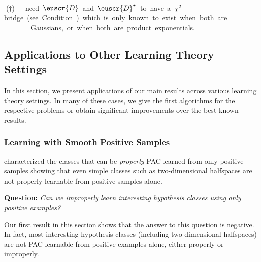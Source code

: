 \documentclass[11pt]{article}
\makeatletter
\newcommand{\white}[1]{\textcolor{white}{#1}}
\theoremstyle{plain}
\theoremstyle{definition}
\theoremstyle{remark}
\renewcommand{\eqref}[1]{\textup{\eqrefform@{\ref{#1}}}}
\let\eqrefform@\tagform@
\newcommand{\customcal}[1]{\euscr{#1}}
\newcommand{\cD}{\customcal{D}}
\newcommand{\cDtrue}{\cD^\star}
\makeatother
\begin{document}
\begin{table}[htb!]
{            \\
            \mbox{\footnotesize \white{.}\quad  ($\dagger$)~~\cite{lee2024unknown} need $\cD$ and $\cDtrue$ to have a $\chi^2$-bridge (see Condition \eqref{unknowntrunc:chisquarebridge}) which is only known to exist when both are}
            \\[-1mm]
            \mbox{\footnotesize \white{.}\quad ~~~~~~ Gaussians, or when both are product exponentials.}
            }
            \vspace{-4mm}
            \label{tab:computational}
        \end{table}
          

\subsection{Applications to Other Learning Theory Settings} \label{sec:intro:application}

In this section, we present applications of our main results across various learning theory settings. In many of these cases, we give the first algorithms for the respective problems or obtain significant improvements over the best-known results.  

    
\subsubsection{Learning with Smooth Positive Samples}\label{sec:intro:application:smooth}

\citet{natarajan1987learning} characterized the classes that can be \textit{properly} PAC learned from only positive samples showing that even simple classes such as two-dimensional halfspaces are not properly learnable from positive samples alone.

\begin{mdframed}
  \textbf{Question:} \textit{Can we improperly learn interesting hypothesis classes using only positive examples?}
\end{mdframed}

\noindent Our first result in this section shows that the answer to this question is negative. In fact, most interesting hypothesis classes (including two-dimensional halfspaces) are not PAC learnable from positive examples alone, either properly or improperly.
\end{document}
